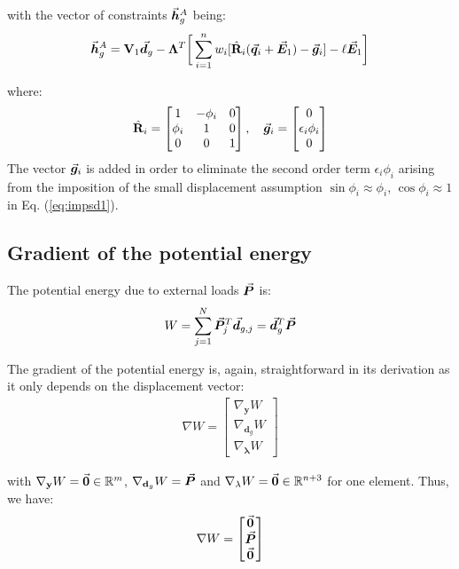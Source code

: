 \begin{appendices}
\noindent with the vector of constraints $\vec{\boldsymbol{h}}_g^A$ being:
\begin{gather}
	\vec{\boldsymbol{h}}^A_g = \mathbf{V}_1\vec{\boldsymbol{d}}_g - \mathbf{\Lambda}^T\bigg[\sum_{i=1}^n
	w_i[\hat{\mathbf{R}}_i(\vec{\boldsymbol{q}}_i+\vec{\boldsymbol{E}}_1) -\vec{\boldsymbol{g}}_i] - 
	\ell\vec{\boldsymbol{E}}_1\bigg]
\end{gather}

\noindent where:
\begin{gather}
	\hat{\mathbf{R}}_i = \begin{bmatrix}
		1 & -\phi_i & 0\\
		\phi_i & 1 & 0\\
		0 & 0 & 1
	\end{bmatrix},\quad \vec{\boldsymbol{g}}_i = \begin{bmatrix}
		0\\ \epsilon_i\phi_i\\ 0
	\end{bmatrix}\nonumber
\end{gather}
\noindent The vector $\vec{\boldsymbol{g}}_i$ is added in order to eliminate the second
order term $\epsilon_i\phi_i$ arising from the imposition of the small
displacement assumption $\sin\phi_i \approx \phi_i$, $\cos\phi_i\approx1$ in Eq.
(\ref{eq:impsd1}).
\subsection{Gradient of the potential energy}

The potential energy due to external loads $\vec{\boldsymbol{P}}$ is:
\begin{gather}
	W = \sum_{j=1}^{N}\vec{\boldsymbol{P}}_j^T\vec{\boldsymbol{d}}_{g,j} = \vec{\boldsymbol{d}}_g^T\vec{\boldsymbol{P}}\nonumber
\end{gather}

\noindent The gradient of the potential energy is, again, straightforward in its
derivation as it only depends on the displacement vector:
\begin{gather}
	\nabla W = \begin{bmatrix}
		\nabla_{\mathbf{y}}W\\ \nabla_{\mathbf{d}_g}W\\ 
		\nabla_{\mathbf{\lambda}}W
	\end{bmatrix}\nonumber
\end{gather}

\noindent with $\nabla_{\mathbf{y}}W = \vec{\boldsymbol{0}}\in\mathbb{R}^m$,
$\nabla_{\mathbf{d}_g}W = \vec{\boldsymbol{P}}$ and $\nabla_{\mathbf{\lambda}}W =
\vec{\boldsymbol{0}}\in\mathbb{R}^{n+3}$ for one element. Thus, we have:
\begin{gather}
	\nabla W = \begin{bmatrix}
		\vec{\boldsymbol{0}}\\ \vec{\boldsymbol{P}}\\ \vec{\boldsymbol{0}}	\end{bmatrix}
\end{gather}


\end{appendices}
